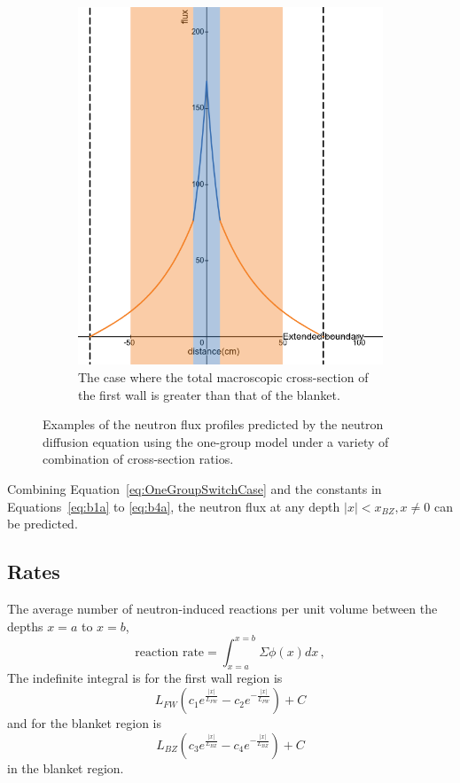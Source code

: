 \documentclass[a4paper, 12pt]{article}
\newcommand{\LFW}[0]{L_{FW}}
\newcommand{\xBZ}[0]{x_{BZ}}
\newcommand{\LBZ}[0]{L_{BZ}}
\begin{document}
\begin{figure}
\begin{subfigure}[b]{0.4\textwidth}
    \includegraphics[width=\textwidth]{OneGroupFluxFWAbs.png}
    \caption{The case where the total macroscopic cross-section of the first wall is greater than that of the blanket.}
    \label{fig:OneGroupFluxFWAbs}
  \end{subfigure}
  \caption{Examples of the neutron flux profiles predicted by the neutron diffusion equation using the one-group model under a variety of combination of cross-section ratios.}\label{fig:OneGroupFlux}
\end{figure}

Combining Equation~\ref{eq:OneGroupSwitchCase} and the constants in Equations~\ref{eq:b1a} to \ref{eq:b4a}, the neutron flux at any depth $|x|<\xBZ, x\neq 0$ can be predicted.

\subsection{Rates}
The average number of neutron-induced reactions per unit volume between the depths $x=a$ to $x=b$,
\begin{equation}
    \text{reaction rate} = \int_{x=a}^{x=b}\Sigma\phi(x)dx\,,
\end{equation}
The indefinite integral is for the first wall region is
\begin{equation}
\LFW (c_1 e^{\frac{|x|}{L_{FW}}} - c_2 e^{-\frac{|x|}{L_{FW}}})+C
\end{equation}
and for the blanket region is
\begin{equation}
\LBZ (c_3 e^{\frac{|x|}{L_{BZ}}} - c_4 e^{-\frac{|x|}{L_{BZ}}})+C
\end{equation}
  in the blanket region.
\end{document}
